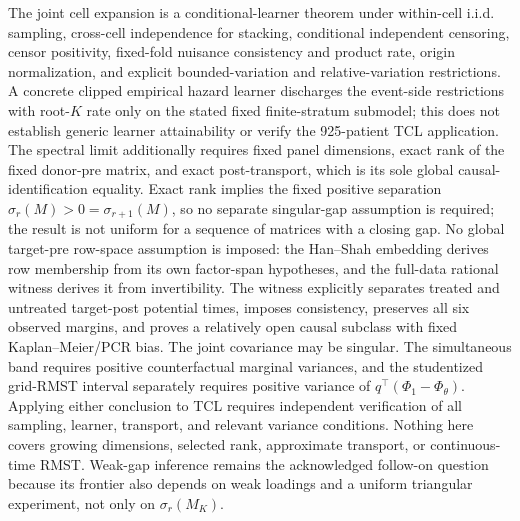 \documentclass{article}
\begin{document}
The joint cell expansion is a conditional-learner theorem under within-cell i.i.d. sampling, cross-cell independence for stacking, conditional independent censoring, censor positivity, fixed-fold nuisance consistency and product rate, origin normalization, and explicit bounded-variation and relative-variation restrictions. A concrete clipped empirical hazard learner discharges the event-side restrictions with root-\(K\) rate only on the stated fixed finite-stratum submodel; this does not establish generic learner attainability or verify the 925-patient TCL application. The spectral limit additionally requires fixed panel dimensions, exact rank of the fixed donor-pre matrix, and exact post-transport, which is its sole global causal-identification equality. Exact rank implies the fixed positive separation \(\sigma_r(M)>0=\sigma_{r+1}(M)\), so no separate singular-gap assumption is required; the result is not uniform for a sequence of matrices with a closing gap. No global target-pre row-space assumption is imposed: the Han--Shah embedding derives row membership from its own factor-span hypotheses, and the full-data rational witness derives it from invertibility. The witness explicitly separates treated and untreated target-post potential times, imposes consistency, preserves all six observed margins, and proves a relatively open causal subclass with fixed Kaplan--Meier/PCR bias. The joint covariance may be singular. The simultaneous band requires positive counterfactual marginal variances, and the studentized grid-RMST interval separately requires positive variance of \(q^\top(\Phi_1-\Phi_\theta)\). Applying either conclusion to TCL requires independent verification of all sampling, learner, transport, and relevant variance conditions. Nothing here covers growing dimensions, selected rank, approximate transport, or continuous-time RMST. Weak-gap inference remains the acknowledged follow-on question because its frontier also depends on weak loadings and a uniform triangular experiment, not only on \(\sigma_r(M_K)\).
\end{document}

